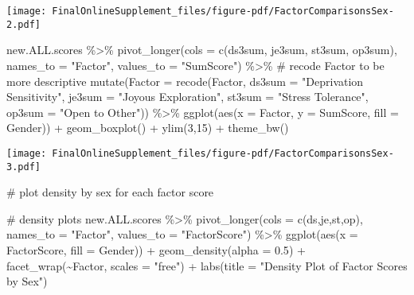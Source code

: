 \documentclass[
  letterpaper,
  DIV=11,
  numbers=noendperiod]{scrartcl}
\newenvironment{Shaded}{\begin{snugshade}}{\end{snugshade}}
\newcommand{\AttributeTok}[1]{\textcolor[rgb]{0.40,0.45,0.13}{#1}}
\newcommand{\CommentTok}[1]{\textcolor[rgb]{0.37,0.37,0.37}{#1}}
\newcommand{\DecValTok}[1]{\textcolor[rgb]{0.68,0.00,0.00}{#1}}
\newcommand{\FloatTok}[1]{\textcolor[rgb]{0.68,0.00,0.00}{#1}}
\newcommand{\FunctionTok}[1]{\textcolor[rgb]{0.28,0.35,0.67}{#1}}
\newcommand{\NormalTok}[1]{\textcolor[rgb]{0.00,0.23,0.31}{#1}}
\newcommand{\SpecialCharTok}[1]{\textcolor[rgb]{0.37,0.37,0.37}{#1}}
\newcommand{\StringTok}[1]{\textcolor[rgb]{0.13,0.47,0.30}{#1}}
\begin{document}
\texttt{[image: FinalOnlineSupplement\_files/figure-pdf/FactorComparisonsSex-2.pdf]}

\begin{Shaded}
\begin{Highlighting}[]
\NormalTok{new.ALL.scores }\SpecialCharTok{\%\textgreater{}\%}
  \FunctionTok{pivot\_longer}\NormalTok{(}\AttributeTok{cols =} \FunctionTok{c}\NormalTok{(ds3sum, je3sum, st3sum, op3sum), }
               \AttributeTok{names\_to =} \StringTok{"Factor"}\NormalTok{, }
               \AttributeTok{values\_to =} \StringTok{"SumScore"}\NormalTok{) }\SpecialCharTok{\%\textgreater{}\%}
  \CommentTok{\# recode Factor to be more descriptive}
  \FunctionTok{mutate}\NormalTok{(}\AttributeTok{Factor =} \FunctionTok{recode}\NormalTok{(Factor, }
                         \AttributeTok{ds3sum =} \StringTok{"Deprivation Sensitivity"}\NormalTok{, }
                         \AttributeTok{je3sum =} \StringTok{"Joyous Exploration"}\NormalTok{, }
                         \AttributeTok{st3sum =} \StringTok{"Stress Tolerance"}\NormalTok{, }
                         \AttributeTok{op3sum =} \StringTok{"Open to Other"}\NormalTok{)) }\SpecialCharTok{\%\textgreater{}\%}
  \FunctionTok{ggplot}\NormalTok{(}\FunctionTok{aes}\NormalTok{(}\AttributeTok{x =}\NormalTok{ Factor, }
             \AttributeTok{y =}\NormalTok{ SumScore, }
             \AttributeTok{fill =}\NormalTok{ Gender)) }\SpecialCharTok{+}
  \FunctionTok{geom\_boxplot}\NormalTok{() }\SpecialCharTok{+}
  \FunctionTok{ylim}\NormalTok{(}\DecValTok{3}\NormalTok{,}\DecValTok{15}\NormalTok{) }\SpecialCharTok{+}
  \FunctionTok{theme\_bw}\NormalTok{()}
\end{Highlighting}
\end{Shaded}

\texttt{[image: FinalOnlineSupplement\_files/figure-pdf/FactorComparisonsSex-3.pdf]}

\begin{Shaded}
\begin{Highlighting}[]
\CommentTok{\# plot density by sex for each factor score}

\CommentTok{\# density plots}
\NormalTok{new.ALL.scores }\SpecialCharTok{\%\textgreater{}\%}
  \FunctionTok{pivot\_longer}\NormalTok{(}\AttributeTok{cols =} \FunctionTok{c}\NormalTok{(ds,je,st,op), }
               \AttributeTok{names\_to =} \StringTok{"Factor"}\NormalTok{, }
               \AttributeTok{values\_to =} \StringTok{"FactorScore"}\NormalTok{) }\SpecialCharTok{\%\textgreater{}\%}
  \FunctionTok{ggplot}\NormalTok{(}\FunctionTok{aes}\NormalTok{(}\AttributeTok{x =}\NormalTok{ FactorScore, }
             \AttributeTok{fill =}\NormalTok{ Gender)) }\SpecialCharTok{+}
  \FunctionTok{geom\_density}\NormalTok{(}\AttributeTok{alpha =} \FloatTok{0.5}\NormalTok{) }\SpecialCharTok{+}
  \FunctionTok{facet\_wrap}\NormalTok{(}\SpecialCharTok{\textasciitilde{}}\NormalTok{Factor, }\AttributeTok{scales =} \StringTok{"free"}\NormalTok{) }\SpecialCharTok{+}
  \FunctionTok{labs}\NormalTok{(}\AttributeTok{title =} \StringTok{"Density Plot of Factor Scores by Sex"}\NormalTok{)}
\end{Highlighting}
\end{Shaded}
\end{document}
